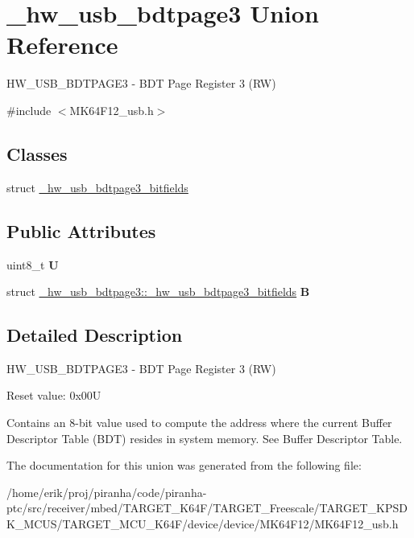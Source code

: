 \hypertarget{union__hw__usb__bdtpage3}{}\section{\+\_\+hw\+\_\+usb\+\_\+bdtpage3 Union Reference}
\label{union__hw__usb__bdtpage3}


H\+W\+\_\+\+U\+S\+B\+\_\+\+B\+D\+T\+P\+A\+G\+E3 -\/ B\+DT Page Register 3 (RW)  




{\ttfamily \#include $<$M\+K64\+F12\+\_\+usb.\+h$>$}

\subsection*{Classes}
\begin{DoxyCompactItemize}
\item 
struct \hyperlink{struct__hw__usb__bdtpage3_1_1__hw__usb__bdtpage3__bitfields}{\+\_\+hw\+\_\+usb\+\_\+bdtpage3\+\_\+bitfields}
\end{DoxyCompactItemize}
\subsection*{Public Attributes}
\begin{DoxyCompactItemize}
\item 
uint8\+\_\+t {\bfseries U}\hypertarget{union__hw__usb__bdtpage3_a120907341208a8d3d64c538c310d5fe9}{}\label{union__hw__usb__bdtpage3_a120907341208a8d3d64c538c310d5fe9}

\item 
struct \hyperlink{struct__hw__usb__bdtpage3_1_1__hw__usb__bdtpage3__bitfields}{\+\_\+hw\+\_\+usb\+\_\+bdtpage3\+::\+\_\+hw\+\_\+usb\+\_\+bdtpage3\+\_\+bitfields} {\bfseries B}\hypertarget{union__hw__usb__bdtpage3_aec5cbd37a57a59b82a9e946b3743bbb1}{}\label{union__hw__usb__bdtpage3_aec5cbd37a57a59b82a9e946b3743bbb1}

\end{DoxyCompactItemize}


\subsection{Detailed Description}
H\+W\+\_\+\+U\+S\+B\+\_\+\+B\+D\+T\+P\+A\+G\+E3 -\/ B\+DT Page Register 3 (RW) 

Reset value\+: 0x00U

Contains an 8-\/bit value used to compute the address where the current Buffer Descriptor Table (B\+DT) resides in system memory. See Buffer Descriptor Table. 

The documentation for this union was generated from the following file\+:\begin{DoxyCompactItemize}
\item 
/home/erik/proj/piranha/code/piranha-\/ptc/src/receiver/mbed/\+T\+A\+R\+G\+E\+T\+\_\+\+K64\+F/\+T\+A\+R\+G\+E\+T\+\_\+\+Freescale/\+T\+A\+R\+G\+E\+T\+\_\+\+K\+P\+S\+D\+K\+\_\+\+M\+C\+U\+S/\+T\+A\+R\+G\+E\+T\+\_\+\+M\+C\+U\+\_\+\+K64\+F/device/device/\+M\+K64\+F12/M\+K64\+F12\+\_\+usb.\+h\end{DoxyCompactItemize}
